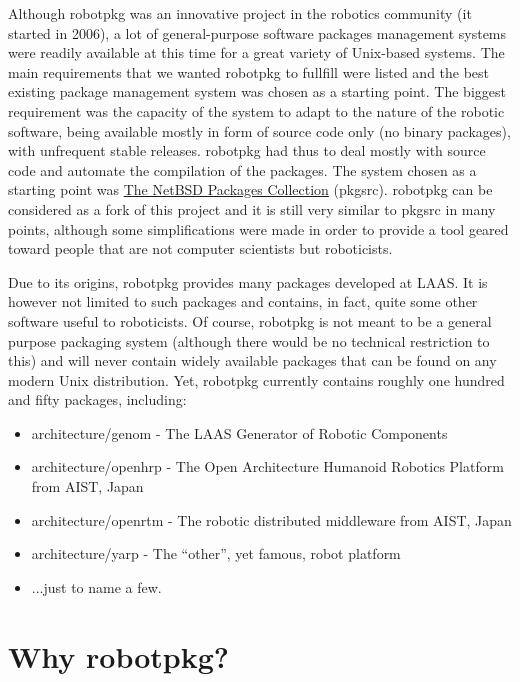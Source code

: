 Although  robotpkg was an  innovative   project in  the robotics community  (it
started in 2006), a lot of general-purpose software packages management systems
were readily available at this time for  a great variety of Unix-based systems.
The main requirements that we wanted  robotpkg to fullfill  were listed and the
best existing package management system  was chosen as  a starting point.   The
biggest requirement was the  capacity of the system to  adapt to the  nature of
the robotic software,  being available mostly in form  of source code  only (no
binary packages),  with unfrequent stable  releases.  robotpkg had thus to deal
mostly with  source code  and automate the  compilation of  the  packages.  The
system chosen  as a starting  point was \href{http://www.pkgsrc.org}{The NetBSD
Packages  Collection} (pkgsrc).  robotpkg  can be considered as  a fork of this
project and  it is still very similar  to pkgsrc in  many points, although some
simplifications were made in order to provide  a tool geared toward people that
are not computer scientists but roboticists.

Due to its  origins, robotpkg provides many packages  developed at LAAS.  It is
however not  limited to such  packages and contains, in  fact, quite some other
software useful to  roboticists.  Of  course, robotpkg  is  not meant to  be  a
general purpose  packaging system   (although  there  would  be   no  technical
restriction to this) and will never  contain widely available packages that can
be found  on  any modern  Unix  distribution. Yet, robotpkg currently  contains
roughly one hundred and fifty packages, including:

\begin{itemize}
   \item architecture/genom - The LAAS Generator of Robotic Components

   \item architecture/openhrp - The Open Architecture Humanoid Robotics
   Platform from AIST, Japan

   \item architecture/openrtm - The robotic distributed middleware from AIST, Japan

   \item architecture/yarp - The ``other'', yet famous, robot platform

   \item ...just to name a few.
\end{itemize}


\section{Why robotpkg?} %

